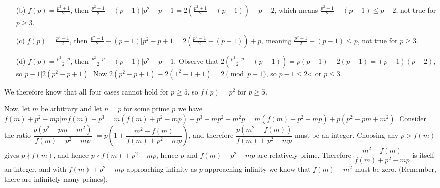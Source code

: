 \documentclass[11pt,a4paper]{article}
\begin{document}
\begin{itemize}
\begin{itemize}
\item [(b)] $f(p)=\frac{p^2+1}2$, 
then $\frac{p^2+1}2-(p-1)|p^2-p+1=2(\frac{p^2+1}2-(p-1))+p-2$, 
which means $\frac{p^2+1}2-(p-1)\le p-2$, not true for $p\ge 3$. 

\item [(c)] $f(p)=\frac{p^2-1}2$, 
then $\frac{p^2-1}2-(p-1)|p^2-p+1=2(\frac{p^2-1}2-(p-1))+p$, 
meaning  $\frac{p^2+1}2-(p-1)\le p$, not true for $p\ge 3$. 

\item [(d)] $f(p)=\frac{p^2-p}2$, 
then $\frac{p^2-p}2-(p-1)|p^2-p+1$. 
Observe that $2(\frac{p^2-p}2-(p-1))=p(p-1)-2(p-1)=(p-1)(p-2)$, 
so $p-1|2(p^2-p+1)$. Now $2(p^2-p+1)\equiv 2(1^2-1+1)=2\pmod{p-1}$, 
so $p-1\le 2$< or $p\le 3$. 
\end{itemize}
We therefore know that all four cases cannot hold for $p\ge 5$, so $f(p)=p^2$ for $p\ge 5$. 

Now, let $m$ be arbitrary and let $n=p$ for some prime $p$ we have 
$f(m)+p^2-mp|mf(m)+p^3=m(f(m)+p^2-mp)+p^3-mp^2+m^2p=m(f(m)+p^2-mp)+p(p^2-pm+m^2)$. 
Consider the ratio $\dfrac{p(p^2-pm+m^2)}{f(m)+p^2-mp}$
$=p(1+\dfrac{m^2-f(m)}{f(m)+p^2-mp})$, 
and therefore $\dfrac{p(m^2-f(m))}{f(m)+p^2-mp}$
must be an integer. 
Choosing any $p>f(m)$ gives 
$p\nmid f(m)$, and hence $p\nmid f(m)+p^2-mp$, hence $p$ and $f(m)+p^2-mp$ are relatively prime. 
Therefore $\dfrac{m^2-f(m)}{f(m)+p^2-mp}$ is itself an integer, 
and with $f(m)+p^2-mp$ approaching infinity as $p$ approaching infinity we know that $f(m)-m^2$ must be zero. 
(Remember, there are infinitely many primes). 

\end{itemize}
\end{document}
